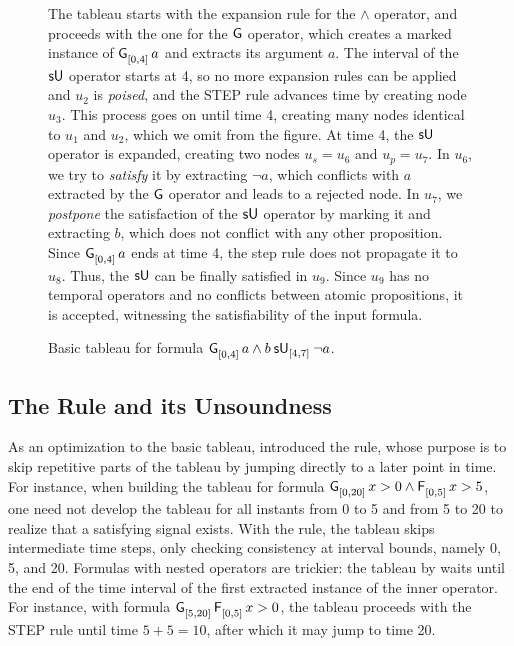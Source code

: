 \documentclass{easychair}
\begin{document}
\begin{figure}
    \begin{minipage}{0.5\textwidth}
        The tableau starts with the expansion rule for the $\land$ operator, and proceeds with the one for the $\globop$ operator, which creates a marked instance of $\glob{[0,4]}a$ and extracts its argument $a$.
        The interval of the $\suntilop$ operator starts at 4, so no more expansion rules can be applied and $u_2$ is \emph{poised}, and the \textsf{STEP} rule advances time by creating node $u_3$.
        This process goes on until time 4, creating many nodes identical to $u_1$ and $u_2$, which we omit from the figure.
        At time 4, the $\suntilop$ operator is expanded, creating two nodes $u_s = u_6$ and $u_p = u_7$.
        In $u_6$, we try to \emph{satisfy} it by extracting $\neg a$, which conflicts with $a$ extracted by the $\globop$ operator and leads to a rejected node.
        In $u_7$, we \emph{postpone} the satisfaction of the $\suntilop$ operator by marking it and extracting $b$, which does not conflict with any other proposition.
        Since $\glob{[0,4]}a$ ends at time 4, the step rule does not propagate it to $u_8$.
        Thus, the $\suntilop$ can be finally satisfied in $u_9$.
        Since $u_9$ has no temporal operators and no conflicts between atomic propositions, it is accepted, witnessing the satisfiability of the input formula.
    \end{minipage}%
    \begin{minipage}{0.5\textwidth}
        \small
        
    \end{minipage}
    \caption{Basic tableau for formula $\glob{[0,4]}a \land \suntil{[4,7]}{b}{\neg a}$.}
    \label{fig:tableau-example}
\end{figure}


\subsection{The \texorpdfstring{\oldjump{}}{JUMPO} Rule and its Unsoundness}
\label{sec:unsound-jump}

As an optimization to the basic tableau, \citet{MelaniBC25} introduced the \oldjump{} rule, whose purpose is to skip repetitive parts of the tableau by jumping directly to a later point in time.
For instance, when building the tableau for formula $\glob{[0,20]}{x > 0} \land \even{[0,5]}{x > 5}$, one need not develop the tableau for all instants from 0 to 5 and from 5 to 20 to realize that a satisfying signal exists.
With the \oldjump{} rule, the tableau skips intermediate time steps, only checking consistency at interval bounds, namely 0, 5, and 20.
%
Formulas with nested operators are trickier: the tableau by \cite{MelaniBC25} waits until the end of the time interval of the first extracted instance of the inner operator.
For instance, with formula $\glob{[5,20]}{\even{[0,5]} x > 0}$, the tableau proceeds with the \textsf{STEP} rule until time $5 + 5 = 10$, after which it may jump to time 20.
\end{document}
